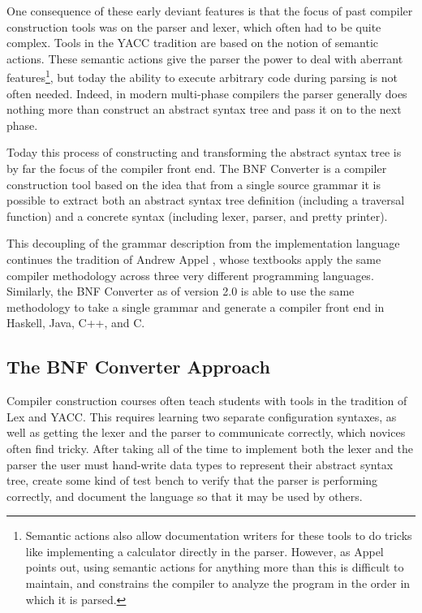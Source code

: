 \documentclass{llncs}
\begin{document}
One consequence of these early deviant features is that the focus of past compiler construction tools was on the parser and lexer, which often had to be quite complex. Tools in the YACC tradition are based on the notion of semantic actions. These semantic actions give the parser the power to deal with aberrant features\footnote{Semantic actions also allow documentation writers for these tools to do tricks like implementing a calculator directly in the parser. However, as Appel \cite{AppelJ} points out, using semantic actions for anything more than this is difficult to maintain, and constrains the compiler to analyze the program in the order in which it is parsed.}, but today the ability to execute arbitrary code during parsing is not often needed. Indeed, in modern multi-phase compilers the parser generally does nothing more than construct an abstract syntax tree and pass it on to the next phase.

Today this process of constructing and transforming the abstract syntax tree is by far the focus of the compiler front end. The BNF Converter is a compiler construction tool based on the idea that from a single source grammar it is possible to extract both an abstract syntax tree definition (including a traversal function) and a concrete syntax (including lexer, parser, and pretty printer).

This decoupling of the grammar description from the implementation language  continues the tradition of Andrew Appel \cite{AppelC, AppelJ, appel}, whose textbooks apply the same compiler methodology across three very different programming languages. Similarly, the BNF Converter as of version 2.0 is able to use the same methodology to take a single grammar and generate a compiler front end in Haskell, Java, C++, and C.

\subsection{The BNF Converter Approach}
Compiler construction courses often teach students with tools in the tradition of Lex and YACC. This requires learning two separate configuration syntaxes, as well as getting the lexer and the parser to communicate correctly, which novices often find tricky. After
taking all of the time to implement both the lexer and the parser the user must  hand-write data types to represent their abstract syntax tree, create some kind of test bench to verify that the parser is performing correctly, and document the language so that it may be used by others.
\end{document}
